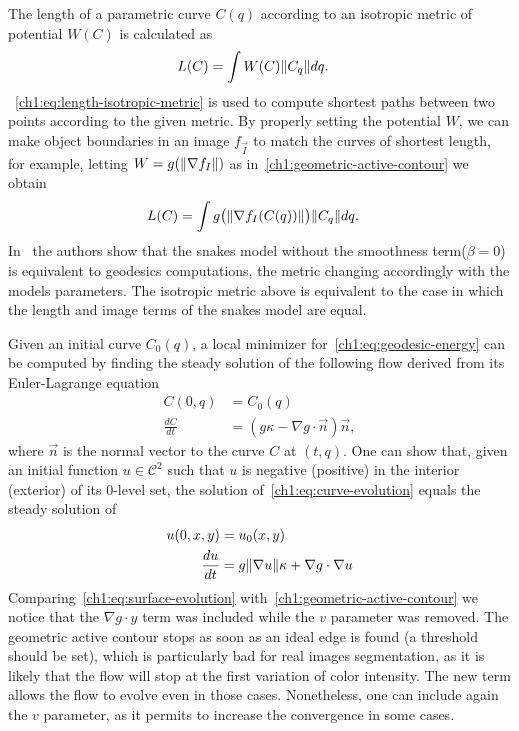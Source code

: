 The length of a parametric curve $C(q)$ according to an isotropic metric of potential $W(C)$ is calculated as 
\begin{align}
	L(C) &= \int{W(C)\lVert C_q\rVert dq}.
	\label{ch1:eq:length-isotropic-metric}
\end{align}
%
~\cref{ch1:eq:length-isotropic-metric} is used to compute shortest paths between two points according to the given metric. By properly setting the potential $W$, we can make object boundaries in an image $f_{\vec{I}}$ to match the curves of shortest length, for example, letting $W=g(\lVert\nabla f_I\rVert)$ as in~\cref{ch1:geometric-active-contour} we obtain
\begin{align}
	L(C) &= \int{g\big(\lVert\nabla f_I(C(q))\rVert\big)\lVert C_q\rVert dq}.
	\label{ch1:eq:geodesic-energy}
\end{align}
%
In~\cite{caselles97} the authors show that the snakes model without the smoothness term($\beta=0$) is equivalent to geodesics computations, the metric changing accordingly with the models parameters. The isotropic metric above is equivalent to the case in which the length and image terms of the snakes model are equal.

Given an initial curve $C_0(q)$, a local minimizer for~\cref{ch1:eq:geodesic-energy} can be computed by finding the steady solution of the following flow derived from its Euler-Lagrange equation
\begin{align}
	C(0,q) &= C_0(q)\\
	\frac{dC}{dt} &= (g\kappa - \nabla g \cdot \vec{n})\vec{n},
	\label{ch1:eq:curve-evolution}
\end{align}
%
where $\vec{n}$ is the normal vector to the curve $C$ at $(t,q)$. One can show that, given an initial function $u \in \mathcal{C}^2$ such that $u$ is negative (positive) in the interior (exterior) of its $0$-level set, the solution of~\cref{ch1:eq:curve-evolution} equals the steady solution of
\begin{align}
	u(0,x,y) &= u_0(x,y) \\
	\frac{du}{dt} &= g\lVert\nabla u\rVert\kappa + \nabla g \cdot \nabla u
	\label{ch1:eq:surface-evolution}
\end{align}
%
Comparing~\cref{ch1:eq:surface-evolution} with~\cref{ch1:geometric-active-contour} we notice that the $\nabla g \cdot y$ term was included while the $v$ parameter was removed. The geometric active contour stops as soon as an ideal edge is found (a threshold should be set), which is particularly bad for real images segmentation, as it is likely that the flow will stop at the first variation of color intensity. The new term allows the flow to evolve even in those cases. Nonetheless, one can include again the $v$ parameter, as it permits to increase the convergence in some cases.

